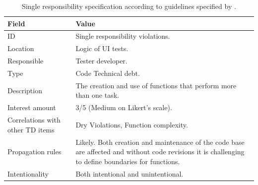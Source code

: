   \begin{table}[!htbp]
		\centering
		\tabulinesep=1.2mm
		\begin{tabu} to \textwidth {|X|X[3]|}

			\hline
			\textbf{Field} & \textbf{Value} \\
			\hline

			ID & Single responsibility violations. \\
			\hline

			Location & Logic of UI tests. \\
			\hline

			Responsible & Tester developer. \\
			\hline

			Type & Code Technical debt. \\
			\hline

			Description & The creation and use of functions that perform more than one task.\\
			\hline



			Interest amount &  3/5 (Medium on Likert's scale). \\
			\hline



			Correlations with other TD items & Dry Violations, Function complexity. \\
			\hline



			Propagation rules & Likely. Both creation and maintenance of the code base are affected and without code revisions it is challenging to define boundaries for functions.\\
			\hline

			Intentionality & Both intentional and unintentional. \\
			\hline

		\end{tabu}
		\label{tab:res-single-responsibility}
		\caption[Single responsibility specification]{Single responsibility specification according to guidelines specified by \cite{mapping_study_td}.}
	\end{table}


